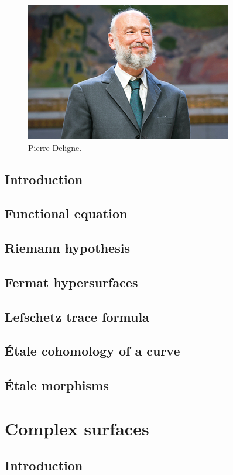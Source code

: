 \documentclass [11 pt, oneside, margin = 1 in] {article}
\begin{document}
\begin{figure}
	\begin{center}
		\includegraphics[scale=0.8]{images/deligne}
		\caption{Pierre Deligne.}
	\end{center}
\end{figure}

\subsection{Introduction}
\subsection{Functional equation}
\subsection{Riemann hypothesis}
\subsection{Fermat hypersurfaces}
\subsection{Lefschetz trace formula}
\subsection{\'Etale cohomology of a curve}
\subsection{\'Etale morphisms}

\section{Complex surfaces}
\subsection{Introduction}
\end{document}
